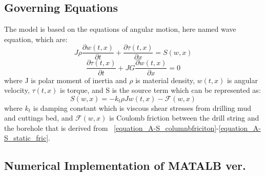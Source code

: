 \subsection{Governing Equations}
The model is based on the equations of angular motion, here named wave equation, which are:
\begin{equation}\label{AS-motion}
  J\rho\frac{\partial w(t,x)}{\partial t} + \frac{\partial \tau (t,x)}{\partial x} = S(w,x) 
\end{equation}
\begin{equation}\label{AS-motion1}
 \frac{\partial\tau(t,x)}{\partial t} + JG\frac{\partial w(t,x)}{\partial x} = 0 
\end{equation}
where J is polar moment of inertia and $\rho$ is material density, $w(t,x)$ is angular velocity, $\tau(t,x)$ is torque, and S is the source term which can be represented as:
\begin{equation}\label{AS-sourceterm}
  S(w,x) = -k_t \rho J w(t,x) - \mathcal{F}(w,x)
\end{equation}
where $k_t$ is damping constant which is viscous shear stresses from drilling mud and cuttings bed, and $\mathcal{F}(w,x)$ is Coulomb friction between the drill string and the borehole that is derived from \equationname~\ref{equation_A-S_columnbfriciton}-\ref{equation_A-S_static_fric}.

\subsection{Numerical Implementation of MATALB ver.}
